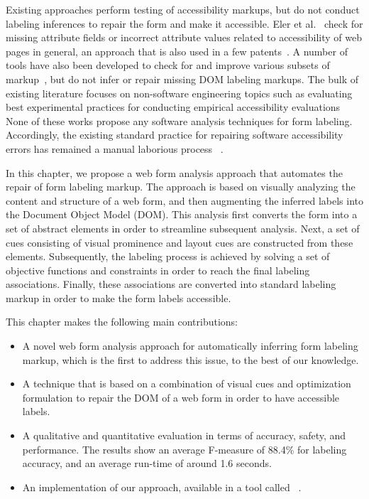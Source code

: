 Existing approaches perform testing of accessibility markups, but do not 
conduct labeling inferences to repair the form and make it accessible. 
Eler et al.~\cite{eler2018automated} check for missing attribute fields or 
incorrect attribute values related to accessibility of web pages in general, 
an approach that is also used in a few patents~\cite{sap2019accessibility, breeds2014software}.
A number of tools have also been developed to check for and improve various subsets 
of markup~\cite{yesilada2019web, asakawa2019transcoding}, 
but do not infer or repair missing DOM labeling markups. 
The bulk of existing literature focuses on non-software engineering topics such as 
evaluating best experimental practices for conducting empirical 
accessibility evaluations~\cite{braga2014applying,bayer2006accessibility,
alshayban2020accessibility, snider2020accessibility, bhagat2019evaluation}
None of these works propose any software analysis techniques for form 
labeling. Accordingly, the existing standard practice for repairing 
software accessibility errors has remained a manual laborious process
~\cite{yesilada2019web, acosta2018toward, bai2016evaluation,
brajnik2008comparative,abou2008web}. 

In this chapter, we propose a web form analysis approach that automates the repair of 
form labeling markup. 
The approach is based on visually analyzing the content and structure of a 
web form, and then augmenting the inferred labels into the Document Object Model (DOM). 
This analysis first converts the form into a set of abstract elements 
in order to streamline subsequent analysis.  
Next, a set of cues consisting of visual prominence and layout cues are 
constructed from these elements. 
Subsequently, the labeling process is achieved by solving a set of 
objective functions and constraints in order to reach the final labeling 
associations. Finally, these associations are converted into standard labeling markup in order to make the form labels accessible. 





This chapter makes the following main contributions:
\begin{itemize}
    \item A novel web form analysis approach for automatically inferring form 
    labeling markup, which is the first to address this issue, to the best of our knowledge.
    \item A technique that is based on a combination of visual cues and 
	optimization formulation to repair the DOM of a web form in order to have accessible labels. 
    \item A qualitative and quantitative evaluation in terms of accuracy, safety, and performance. 
The results show an average F-measure of 88.4\% for labeling accuracy, and an average run-time of around 1.6 seconds.
	\item An implementation of our approach, available in a tool called \toolname~\cite{tool-and-data}.
\end{itemize}


